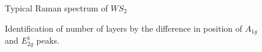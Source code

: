 \begin{figure}[h]
	\begin{center}
		\caption{Typical Raman spectrum of $WS_2$}
		\label{fig:TypicalRamanSpectrumWS2}
	\end{center}
\end{figure}
	
\begin{figure}
	\begin{center}
	\caption{Identification of number of layers by the difference in position of $A_{1g}$ and $E^1_{2g}$ peaks.}
	\label{fig:LayerNumberIdentificationRamanShiftWS2}
	\end{center}
\end{figure}

